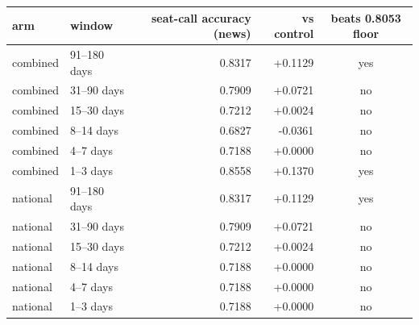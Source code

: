 \begin{tabular}{llrrc}
\toprule
arm & window & seat-call accuracy (news) & vs control & beats 0.8053 floor \\
\midrule
combined & 91--180 days & 0.8317 & +0.1129 & yes \\
combined & 31--90 days & 0.7909 & +0.0721 & no \\
combined & 15--30 days & 0.7212 & +0.0024 & no \\
combined & 8--14 days & 0.6827 & -0.0361 & no \\
combined & 4--7 days & 0.7188 & +0.0000 & no \\
combined & 1--3 days & 0.8558 & +0.1370 & yes \\
national & 91--180 days & 0.8317 & +0.1129 & yes \\
national & 31--90 days & 0.7909 & +0.0721 & no \\
national & 15--30 days & 0.7212 & +0.0024 & no \\
national & 8--14 days & 0.7188 & +0.0000 & no \\
national & 4--7 days & 0.7188 & +0.0000 & no \\
national & 1--3 days & 0.7188 & +0.0000 & no \\
\bottomrule
\end{tabular}
